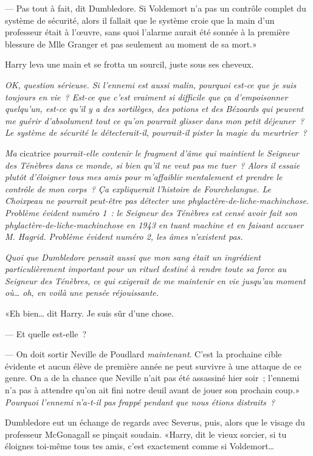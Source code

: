 --- Pas tout à fait, dit Dumbledore. Si Voldemort n'a pas un contrôle complet du système de sécurité, alors il fallait que le système croie que la main d'un professeur était à l'œuvre, sans quoi l'alarme aurait été sonnée à la première blessure de Mlle Granger et pas seulement au moment de sa mort.»

Harry leva une main et se frotta un sourcil, juste sous ses cheveux.

\emph{OK, question sérieuse. Si l'ennemi est aussi malin, pourquoi est-ce que je suis toujours en vie~? Est-ce que c'est vraiment si difficile que ça d'empoisonner quelqu'un, est-ce qu'il y a des sortilèges, des potions et des Bézoards qui peuvent me guérir d'absolument tout ce qu'on pourrait glisser dans mon petit déjeuner~? Le système de sécurité le détecterait-il, pourrait-il pister la magie du meurtrier~?}

\emph{Ma} cicatrice \emph{pourrait-elle contenir le fragment d'âme qui maintient le Seigneur des Ténèbres dans ce monde, si bien qu'il ne veut pas me tuer~? Alors il essaie plutôt d'éloigner tous mes amis pour m'affaiblir mentalement et prendre le contrôle de mon corps~? Ça expliquerait l'histoire de Fourchelangue. Le Choixpeau ne pourrait peut-être pas détecter une phylactère-de-liche-machinchose. Problème évident numéro 1~: le Seigneur des Ténèbres est censé avoir fait son phylactère-de-liche-machinchose en 1943 en tuant machine et en faisant accuser M. Hagrid. Problème évident numéro 2, les âmes n'existent pas.}

\emph{Quoi que Dumbledore pensait aussi que mon sang était un ingrédient particulièrement important pour un rituel destiné à rendre toute sa force au Seigneur des Ténèbres, ce qui exigerait de me maintenir en vie jusqu'au moment où… oh, en voilà une pensée réjouissante.}

«Eh bien… dit Harry. Je suis sûr d'une chose.

--- Et quelle est-elle~?

--- On doit sortir Neville de Poudlard \emph{maintenant}. C'est la prochaine cible évidente et aucun élève de première année ne peut survivre à une attaque de ce genre. On a de la chance que Neville n'ait pas été assassiné hier soir~; l'ennemi n'a pas à attendre qu'on ait fini notre deuil avant de jouer son prochain coup.» \emph{Pourquoi l'ennemi n'a-t-il pas frappé pendant que nous étions distraits~?}

Dumbledore eut un échange de regards avec Severus, puis, alors que le visage du professeur McGonagall se pinçait soudain. «Harry, dit le vieux sorcier, si tu éloignes toi-même tous tes amis, c'est exactement comme si Voldemort…

